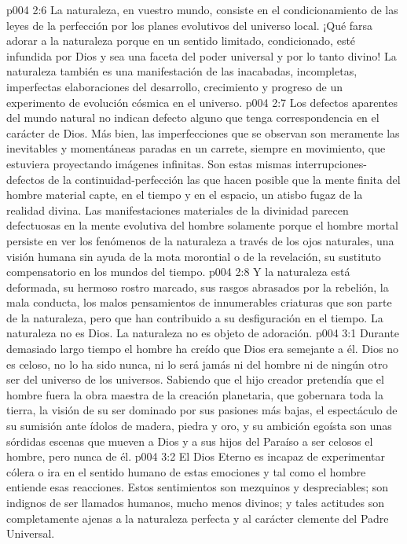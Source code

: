 \vs p004 2:6 La naturaleza, en vuestro mundo, consiste en el condicionamiento de las leyes de la perfección por los planes evolutivos del universo local. ¡Qué farsa adorar a la naturaleza porque en un sentido limitado, condicionado, esté infundida por Dios y sea una faceta del poder universal y por lo tanto divino! La naturaleza también es una manifestación de las inacabadas, incompletas, imperfectas elaboraciones del desarrollo, crecimiento y progreso de un experimento de evolución cósmica en el universo.
\vs p004 2:7 Los defectos aparentes del mundo natural no indican defecto alguno que tenga correspondencia en el carácter de Dios. Más bien, las imperfecciones que se observan son meramente las inevitables y momentáneas paradas en un carrete, siempre en movimiento, que estuviera proyectando imágenes infinitas. Son estas mismas interrupciones\hyp{}defectos de la continuidad\hyp{}perfección las que hacen posible que la mente finita del hombre material capte, en el tiempo y en el espacio, un atisbo fugaz de la realidad divina. Las manifestaciones materiales de la divinidad parecen defectuosas en la mente evolutiva del hombre solamente porque el hombre mortal persiste en ver los fenómenos de la naturaleza a través de los ojos naturales, una visión humana sin ayuda de la mota morontial o de la revelación, su sustituto compensatorio en los mundos del tiempo.
\vs p004 2:8 Y la naturaleza está deformada, su hermoso rostro marcado, sus rasgos abrasados por la rebelión, la mala conducta, los malos pensamientos de innumerables criaturas que son parte de la naturaleza, pero que han contribuido a su desfiguración en el tiempo. La naturaleza no es Dios. La naturaleza no es objeto de adoración.
\vs p004 3:1 Durante demasiado largo tiempo el hombre ha creído que Dios era semejante a él. Dios no es celoso, no lo ha sido nunca, ni lo será jamás ni del hombre ni de ningún otro ser del universo de los universos. Sabiendo que el hijo creador pretendía que el hombre fuera la obra maestra de la creación planetaria, que gobernara toda la tierra, la visión de su ser dominado por sus pasiones más bajas, el espectáculo de su sumisión ante ídolos de madera, piedra y oro, y su ambición egoísta son unas sórdidas escenas que mueven a Dios y a sus hijos del Paraíso a ser celosos  el hombre, pero nunca de él.
\vs p004 3:2 El Dios Eterno es incapaz de experimentar cólera o ira en el sentido humano de estas emociones y tal como el hombre entiende esas reacciones. Estos sentimientos son mezquinos y despreciables; son indignos de ser llamados humanos, mucho menos divinos; y tales actitudes son completamente ajenas a la naturaleza perfecta y al carácter clemente del Padre Universal.
